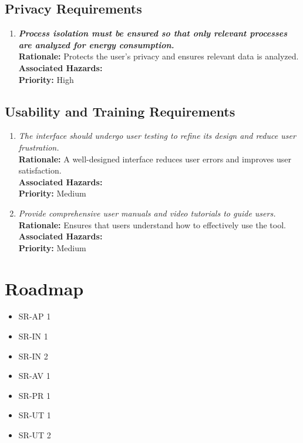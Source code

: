 \documentclass{article}
\begin{document}
\subsection{Privacy Requirements}
\begin{enumerate}[label=SR-PR \arabic*., wide=0pt, leftmargin=*]
    \item \emph{\textbf{Process isolation must be ensured so that only relevant processes are analyzed for energy consumption.}}\\[2mm]
    {\bf Rationale:} Protects the user's privacy and ensures relevant data is analyzed.\\
    {\bf Associated Hazards:} \\
    {\bf Priority:} High
\end{enumerate}

\subsection{Usability and Training Requirements}
\begin{enumerate}[label=SR-UT \arabic*., wide=0pt, leftmargin=*]
    \item \emph{The interface should undergo user testing to refine its design and reduce user frustration.}\\[2mm]
    {\bf Rationale:} A well-designed interface reduces user errors and improves user satisfaction.\\
    {\bf Associated Hazards:} \\
    {\bf Priority:} Medium
    \item \emph{Provide comprehensive user manuals and video tutorials to guide users.}\\[2mm]
    {\bf Rationale:} Ensures that users understand how to effectively use the tool.\\
    {\bf Associated Hazards:} \\
    {\bf Priority:} Medium
\end{enumerate}

\section{Roadmap}

\begin{itemize}
    \item SR-AP 1
    \item SR-IN 1
    \item SR-IN 2
    \item SR-AV 1
    \item SR-PR 1
    \item SR-UT 1
    \item SR-UT 2
\end{itemize}
\end{document}
